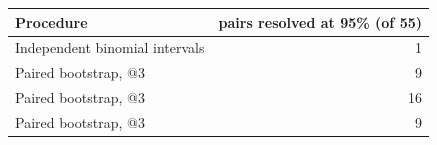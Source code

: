 \begin{tabular}{lr}
\toprule
Procedure & pairs resolved at 95\% (of 55) \\
\midrule
Independent binomial intervals & 1 \\
Paired bootstrap, \usable{}@3 & 9 \\
Paired bootstrap, \pass{}@3 & 16 \\
Paired bootstrap, \vuln{}@3 & 9 \\
\bottomrule
\end{tabular}
